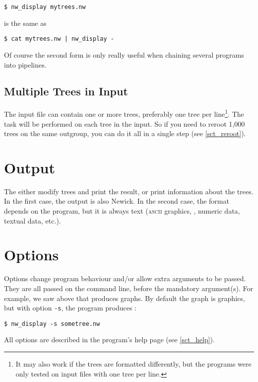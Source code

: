 \begin{samepage}
\begin{verbatim}
$ nw_display mytrees.nw
\end{verbatim}
is the same as
\begin{verbatim}
$ cat mytrees.nw | nw_display -
\end{verbatim}
\end{samepage}
Of course the second form is only really useful when chaining several programs into pipelines.

\subsection{Multiple Trees in Input}

The input file can contain one or more trees, preferably one tree per
line\footnote{It may also work if the trees are formatted differently, but the
programs were only tested on input files with one tree per line.}. The task
will be performed on each tree in the input. So if you need to reroot 1,000
trees on the same outgroup, you can do it all in a single step (see
\ref{sct_reroot}). 

\section{Output}
\label{sct_output}

The \nutils{} either modify trees and print the result, or print information about the trees. In the first case, the output is also Newick. In the second case, the format depends on the program, but it is always text (\textsc{ascii} graphics, \svg, numeric data, textual data, etc.).

\section{Options}
\label{sct_options}

Options change program behaviour and/or allow extra arguments to be passed.
They are all passed on the command line, before the mandatory argument(s). For
example, we saw above that \display{} produces graphs. By default the graph is \ascii{} graphics, but with option \texttt{-s}, the program produces \svg:
\begin{verbatim}
$ nw_display -s sometree.nw
\end{verbatim}
All options are described in the program's help page (see \ref{sct_help}).

